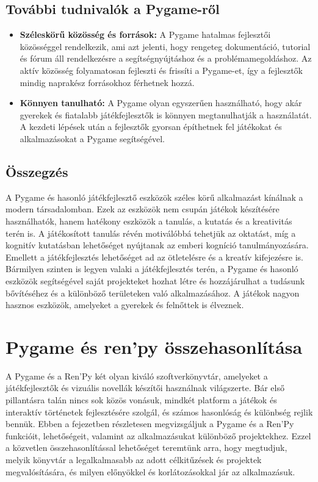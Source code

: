 \subsection{További tudnivalók a Pygame-ről}

\begin{itemize}
\item \textbf{Széleskörű közösség és források:}
A Pygame hatalmas fejlesztői közösséggel rendelkezik, ami azt jelenti, hogy rengeteg dokumentáció, tutorial és fórum áll rendelkezésre a segítségnyújtáshoz és a problémamegoldáshoz. Az aktív közösség folyamatosan fejleszti és frissíti a Pygame-et, így a fejlesztők mindig naprakész forrásokhoz férhetnek hozzá.

\item \textbf{Könnyen tanulható:}
A Pygame olyan egyszerűen használható, hogy akár gyerekek és fiatalabb játékfejlesztők is könnyen megtanulhatják a használatát. A kezdeti lépések után a fejlesztők gyorsan építhetnek fel játékokat és alkalmazásokat a Pygame segítségével.
\end{itemize}

\subsection{Összegzés}
 A Pygame és hasonló játékfejlesztő eszközök széles körű alkalmazást kínálnak a modern társadalomban.
 Ezek az eszközök nem csupán játékok készítésére használhatók, hanem hatékony eszközök a tanulás,
  a kutatás és a kreativitás terén is. A játékosított tanulás révén motiválóbbá tehetjük az oktatást, 
  míg a kognitív kutatásban lehetőséget nyújtanak az emberi kogníció tanulmányozására.
   Emellett a játékfejlesztés lehetőséget ad az ötletelésre és a kreatív kifejezésre is.
    Bármilyen szinten is legyen valaki a játékfejlesztés terén,
 a Pygame és hasonló eszközök segítségével saját projekteket hozhat létre és hozzájárulhat a
  tudásunk bővítéséhez és a különböző területeken való alkalmazásához.
   A játékok nagyon hasznos eszközök, amelyeket a gyerekek és felnőttek is élveznek.



\section{Pygame és ren'py összehasonlítása} 
 A Pygame és a Ren'Py \cite{renpy} két olyan kiváló szoftverkönyvtár, amelyeket a játékfejlesztők és vizuális novellák készítői használnak világszerte. Bár első pillantásra talán nincs sok közös vonásuk, mindkét platform a játékok és interaktív történetek fejlesztésére szolgál, és számos hasonlóság és különbség rejlik bennük. Ebben a fejezetben részletesen megvizsgáljuk a Pygame és a Ren'Py funkcióit, lehetőségeit, valamint az alkalmazásukat különböző projektekhez. Ezzel a közvetlen összehasonlítással \cite{Pygame-renpy} lehetőséget teremtünk arra, hogy megtudjuk, melyik könyvtár a legalkalmasabb az adott célkitűzések és projektek megvalósítására, és milyen előnyökkel és korlátozásokkal jár az alkalmazásuk.

